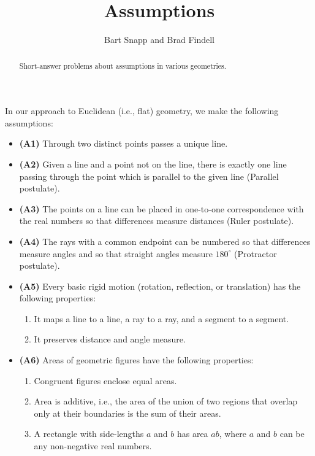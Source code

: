 \documentclass[nooutcomes]{ximera}
\title{Assumptions}
\author{Bart Snapp and Brad Findell}
\begin{document}
\begin{abstract}
Short-answer problems about assumptions in various geometries. 
\end{abstract}
\maketitle

In our approach to Euclidean (i.e., flat) geometry, we make the following assumptions:
\begin{itemize}
\item \textbf{(A1)} Through two distinct points passes a unique line.
\item \textbf{(A2)} Given a line and a point not on the line, there is exactly one line passing through the point which is parallel to the given line (Parallel postulate).
\item \textbf{(A3)} The points on a line can be placed in one-to-one correspondence with the real numbers so that differences measure distances (Ruler postulate).  
\item \textbf{(A4)} The rays with a common endpoint can be numbered so that differences measure angles and so that straight angles measure $180^\circ$ (Protractor postulate). 
\item \textbf{(A5)} Every basic rigid motion (rotation, reflection, or translation) has the following properties:
\begin{enumerate}
\item It maps a line to a line, a ray to a ray, and a segment to a segment.
\item It preserves distance and angle measure.
\end{enumerate}
\item \textbf{(A6)} Areas of geometric figures have the following properties: 
\begin{enumerate}
\item Congruent figures enclose equal areas.
\item Area is additive, i.e., the area of the union of two regions that overlap only at their boundaries is the sum of their areas. 
\item A rectangle with side-lengths $a$ and $b$ has area $ab$, where $a$ and $b$ can be any non-negative real numbers.
\end{enumerate}
\end{itemize}
\end{document}

